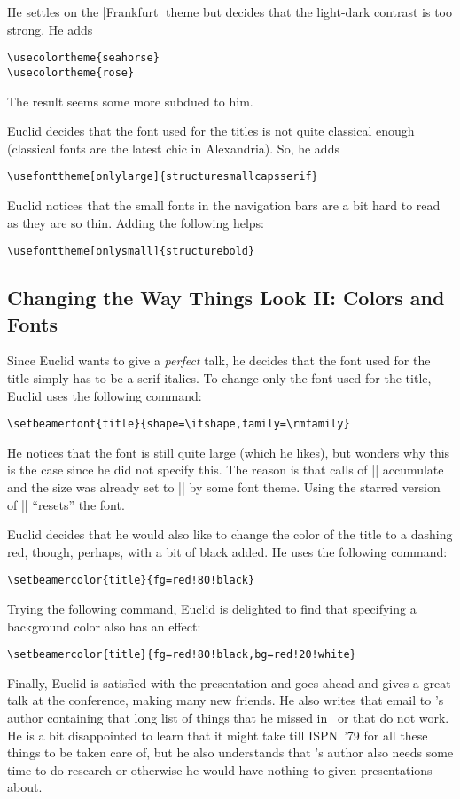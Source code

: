 He settles on the |Frankfurt| theme but decides that the light-dark
contrast is too strong. He adds
\begin{verbatim}
\usecolortheme{seahorse}
\usecolortheme{rose} 
\end{verbatim}  
The result seems some more subdued to him.

Euclid decides that the font used for the titles is not quite
classical enough (classical fonts are the latest chic in
Alexandria). So, he adds
\begin{verbatim}
\usefonttheme[onlylarge]{structuresmallcapsserif}
\end{verbatim}

Euclid notices that the small fonts in the navigation bars
are a bit hard to read as they are so thin. Adding the following
helps:
\begin{verbatim}
\usefonttheme[onlysmall]{structurebold}
\end{verbatim}


\subsection{Changing the Way Things Look II: Colors and Fonts}

Since Euclid wants to give a \emph{perfect} talk, he decides that the
font used for the title simply has to be a serif italics. To change
only the font used for the title, Euclid uses the following command:
\begin{verbatim}
\setbeamerfont{title}{shape=\itshape,family=\rmfamily}
\end{verbatim}
He notices that the font is still quite large (which he likes), but
wonders why this is the case since he did not specify this. The reason
is that calls of |\setbeamerfont| accumulate and the size was already
set to |\large| by some font theme. Using the starred version of
|\setbeamerfont| ``resets'' the font.

Euclid decides that he would also like to change the color of the
title to a dashing red, though, perhaps, with a bit of black added. He
uses the following command:
\begin{verbatim}
\setbeamercolor{title}{fg=red!80!black}
\end{verbatim}
Trying the following command, Euclid is delighted to find that
specifying a background color also has an effect:
\begin{verbatim}
\setbeamercolor{title}{fg=red!80!black,bg=red!20!white}
\end{verbatim}


Finally, Euclid is satisfied with the presentation and goes ahead and
gives a great talk at the conference, making many new friends. He also
writes that email to \beamer's author containing that long list of
things that he missed in \beamer\ or that do not work. He is a bit
disappointed to learn that it might take till ISPN~'79 for all these
things to be taken care of, but he also understands that \beamer's
author also needs some time to do research or otherwise he would have
nothing to given presentations about.

